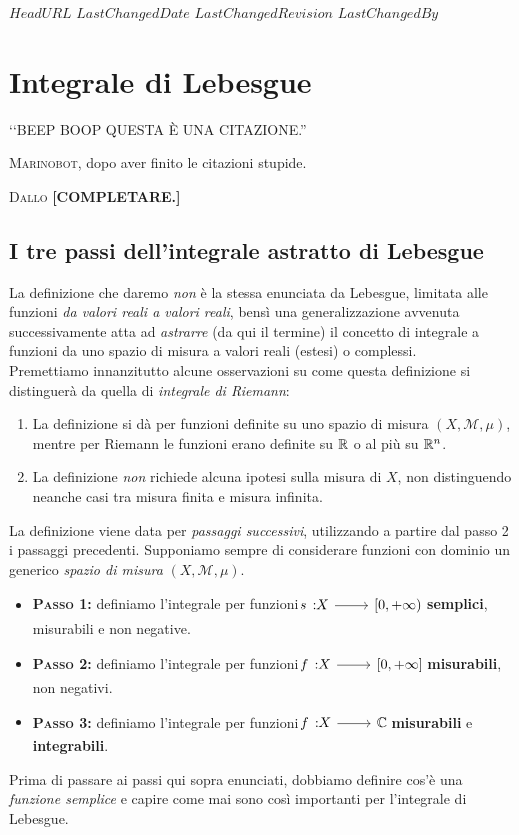 \svnidlong
{$HeadURL$}
{$LastChangedDate$}
{$LastChangedRevision$}
{$LastChangedBy$}

\chapter{Integrale di Lebesgue}

\begin{introduction}
	‘‘BEEP BOOP QUESTA È UNA CITAZIONE.''
	\begin{flushright}
		\textsc{Marinobot,} dopo aver finito le citazioni stupide.
	\end{flushright}
\end{introduction}
\lettrine[findent=1pt, nindent=0pt]{D}{allo} \textbf{[COMPLETARE.]}
\section{I tre passi dell'integrale astratto di Lebesgue}
La definizione che daremo \textit{non} è la stessa enunciata da Lebesgue, limitata alle funzioni \textit{da valori reali a valori reali}, bensì una generalizzazione avvenuta successivamente atta ad \textit{astrarre} (da qui il termine) il concetto di integrale a funzioni da uno spazio di misura a valori reali (estesi) o complessi.\\
Premettiamo innanzitutto alcune osservazioni su come questa definizione si distinguerà da quella di \textit{integrale di Riemann}:
\begin{enumerate}
	\item La definizione si dà per funzioni definite su uno spazio di misura $\left(X,\mathcal{M},\mu\right)$, mentre per Riemann le funzioni erano definite su $\mathbb{R}$ o al più su $\mathbb{R}^n$.	
	\item La definizione \textit{non} richiede alcuna ipotesi sulla misura di $X$, non distinguendo neanche casi tra misura finita e misura infinita.
\end{enumerate}
La definizione viene data per \textit{passaggi successivi}, utilizzando a partire dal passo 2 i passaggi precedenti. Supponiamo sempre di considerare funzioni con dominio un generico \textit{spazio di misura} $\left(X,\mathcal{M},\mu\right)$.
\begin{itemize}
	\item \textbf{\textsc{Passo 1:}} definiamo l'integrale per funzioni $\funz{s}{X}{\left[0,+\infty\right)}$ \textbf{semplici}, misurabili e non negative.
	\item \textbf{\textsc{Passo 2:}} definiamo l'integrale per funzioni
	$\funz{f}{X}{\left[0,+\infty\right]}$ \textbf{misurabili}, non negativi.
	\item \textbf{\textsc{Passo 3:}} definiamo l'integrale per funzioni $\funz{f}{X}{\complexset}$ \textbf{misurabili} e \textbf{integrabili}.
\end{itemize}
Prima di passare ai passi qui sopra enunciati, dobbiamo definire cos'è una \textit{funzione semplice} e capire come mai sono così importanti per l'integrale di Lebesgue.
